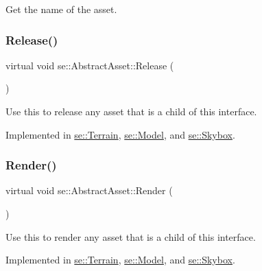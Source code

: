 Get the name of the asset. \mbox{\label{classse_1_1_abstract_asset_aea97e36f647efdb07a801b6fc468388d}} 
\subsubsection{\texorpdfstring{Release()}{Release()}}
{\footnotesize\ttfamily virtual void se\+::\+Abstract\+Asset\+::\+Release (\begin{DoxyParamCaption}{ }\end{DoxyParamCaption})\hspace{0.3cm}{\ttfamily [pure virtual]}}

Use this to release any asset that is a child of this interface. 

Implemented in \mbox{\hyperlink{classse_1_1_terrain_aab4ebd41c3ae26b258928d8f2454ed88}{se\+::\+Terrain}}, \mbox{\hyperlink{classse_1_1_model_a0c1ecdbb68d2fb655e33e63ed35ddc4c}{se\+::\+Model}}, and \mbox{\hyperlink{classse_1_1_skybox_a86c5fb357bbe7c58099d3b85f0df1408}{se\+::\+Skybox}}.

\mbox{\label{classse_1_1_abstract_asset_a2addad2ca18a3ffbcbe1e80afa0ad56c}} 
\subsubsection{\texorpdfstring{Render()}{Render()}}
{\footnotesize\ttfamily virtual void se\+::\+Abstract\+Asset\+::\+Render (\begin{DoxyParamCaption}{ }\end{DoxyParamCaption})\hspace{0.3cm}{\ttfamily [pure virtual]}}

Use this to render any asset that is a child of this interface. 

Implemented in \mbox{\hyperlink{classse_1_1_terrain_a0fcef77b6b1d8e32ce49a396d4d733e2}{se\+::\+Terrain}}, \mbox{\hyperlink{classse_1_1_model_a8f7aeee14ed8e5c63f8f58451d8e1d19}{se\+::\+Model}}, and \mbox{\hyperlink{classse_1_1_skybox_a2c33944b8f383c4eda21ae1c60e3025a}{se\+::\+Skybox}}.



